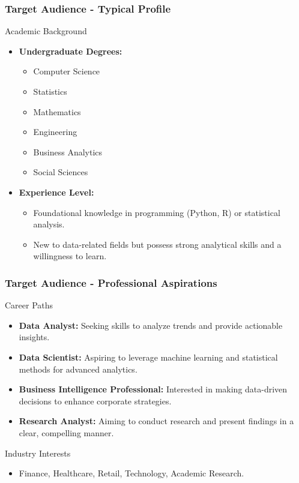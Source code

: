 \documentclass[aspectratio=169]{beamer}
\begin{document}
\begin{frame}[fragile]
  \frametitle{Target Audience - Typical Profile}
  \begin{block}{Academic Background}
    \begin{itemize}
      \item \textbf{Undergraduate Degrees:}
        \begin{itemize}
          \item Computer Science
          \item Statistics
          \item Mathematics
          \item Engineering
          \item Business Analytics
          \item Social Sciences
        \end{itemize}
      \item \textbf{Experience Level:} 
        \begin{itemize}
          \item Foundational knowledge in programming (Python, R) or statistical analysis.
          \item New to data-related fields but possess strong analytical skills and a willingness to learn.
        \end{itemize}
    \end{itemize}
  \end{block}
\end{frame}

\begin{frame}[fragile]
  \frametitle{Target Audience - Professional Aspirations}
  \begin{block}{Career Paths}
    \begin{itemize}
      \item \textbf{Data Analyst:} Seeking skills to analyze trends and provide actionable insights.
      \item \textbf{Data Scientist:} Aspiring to leverage machine learning and statistical methods for advanced analytics.
      \item \textbf{Business Intelligence Professional:} Interested in making data-driven decisions to enhance corporate strategies.
      \item \textbf{Research Analyst:} Aiming to conduct research and present findings in a clear, compelling manner.
    \end{itemize}
  \end{block}
  
  \begin{block}{Industry Interests}
    \begin{itemize}
      \item Finance, Healthcare, Retail, Technology, Academic Research.
    \end{itemize}
  \end{block}
\end{frame}
\end{document}
